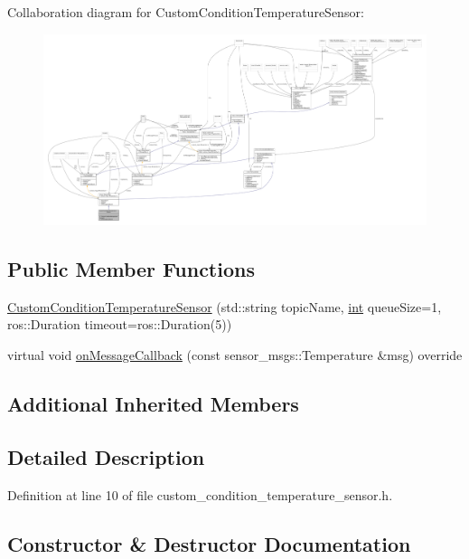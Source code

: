 Collaboration diagram for Custom\+Condition\+Temperature\+Sensor\+:
\nopagebreak
\begin{figure}[H]
\begin{center}
\leavevmode
\includegraphics[width=350pt]{classCustomConditionTemperatureSensor__coll__graph}
\end{center}
\end{figure}
\subsection*{Public Member Functions}
\begin{DoxyCompactItemize}
\item 
\hyperlink{classCustomConditionTemperatureSensor_abc4c749adb4996745639c8848de51990}{Custom\+Condition\+Temperature\+Sensor} (std\+::string topic\+Name, \hyperlink{classint}{int} queue\+Size=1, ros\+::\+Duration timeout=ros\+::\+Duration(5))
\item 
virtual void \hyperlink{classCustomConditionTemperatureSensor_a34847ebb7d87c53d332e1b8c956e9720}{on\+Message\+Callback} (const sensor\+\_\+msgs\+::\+Temperature \&msg) override
\end{DoxyCompactItemize}
\subsection*{Additional Inherited Members}


\subsection{Detailed Description}


Definition at line 10 of file custom\+\_\+condition\+\_\+temperature\+\_\+sensor.\+h.



\subsection{Constructor \& Destructor Documentation}

